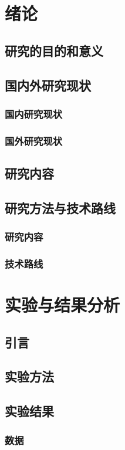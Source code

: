 \documentclass{ctexbook}
\begin{document}
    \tableofcontents  %

    \chapter{绪论}  %
    \section{研究的目的和意义}
    \section{国内外研究现状}
    \subsection{国内研究现状}
    \subsection{国外研究现状}
    \section{研究内容}
    \section{研究方法与技术路线}
    \subsection{研究内容}
    \subsection{技术路线}
    
    \chapter{实验与结果分析}
    \section{引言}
    \section{实验方法}
    \section{实验结果}
    \subsection{数据}
\end{document}
